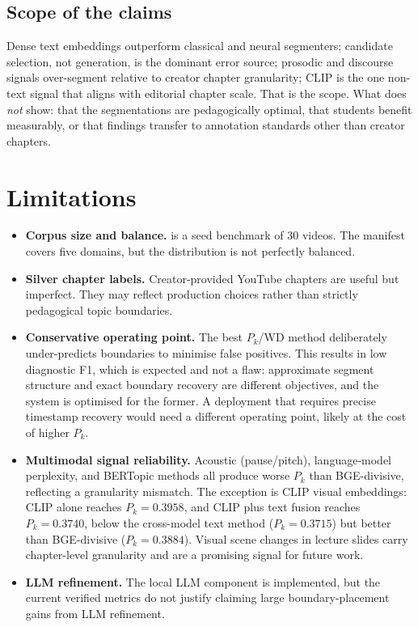 \subsection*{Scope of the claims}

Dense text embeddings outperform classical and neural segmenters; candidate
selection, not generation, is the dominant error source; prosodic and discourse
signals over-segment relative to creator chapter granularity; CLIP is the one
non-text signal that aligns with editorial chapter scale.
That is the scope. What \dataset{} does \emph{not} show: that the segmentations
are pedagogically optimal, that students benefit measurably, or that findings
transfer to annotation standards other than creator chapters.

\section{Limitations}

\begin{itemize}
  \item \textbf{Corpus size and balance.}
    \dataset{} is a seed benchmark of 30 videos. The manifest covers five
    domains, but the distribution is not perfectly balanced.

  \item \textbf{Silver chapter labels.}
    Creator-provided YouTube chapters are useful but imperfect. They may reflect
    production choices rather than strictly pedagogical topic boundaries.

  \item \textbf{Conservative operating point.}
    The best $P_k$/WD method deliberately under-predicts boundaries to minimise
    false positives. This results in low diagnostic F1, which is expected and
    not a flaw: approximate segment structure and exact boundary recovery are
    different objectives, and the system is optimised for the former.
    A deployment that requires precise timestamp recovery would need a different
    operating point, likely at the cost of higher $P_k$.

  \item \textbf{Multimodal signal reliability.}
    Acoustic (pause/pitch), language-model perplexity, and BERTopic methods
    all produce worse $P_k$ than BGE-divisive, reflecting a granularity
    mismatch. The exception is CLIP visual embeddings: CLIP alone reaches
    $P_k=0.3958$, and CLIP plus text fusion reaches $P_k=0.3740$, below the
    cross-model text method ($P_k=0.3715$) but better than BGE-divisive
    ($P_k=0.3884$). Visual scene changes in lecture slides carry chapter-level
    granularity and are a promising signal for future work.

  \item \textbf{LLM refinement.}
    The local LLM component is implemented, but the current verified metrics do
    not justify claiming large boundary-placement gains from LLM refinement.
\end{itemize}

